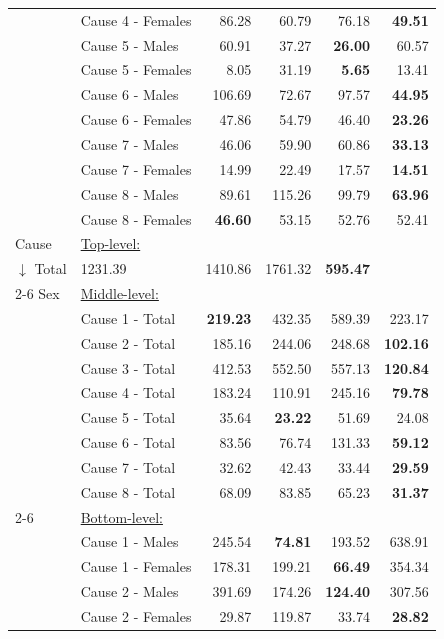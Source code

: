 \begin{center}
\begin{small}
\begin{longtable}{@{}llrrrr@{}}
& Cause 4 - Females & 86.28 & 60.79 & 76.18 & \textbf{49.51} \\
& Cause 5 - Males & 60.91 & 37.27 & \textbf{26.00} & 60.57 \\
& Cause 5 - Females & 8.05 & 31.19 & \textbf{5.65} & 13.41 \\
& Cause 6 - Males & 106.69 & 72.67 & 97.57 & \textbf{44.95} \\
& Cause 6 - Females & 47.86 & 54.79 & 46.40 & \textbf{23.26} \\
& Cause 7 - Males & 46.06 & 59.90 & 60.86 & \textbf{33.13} \\
& Cause 7 - Females & 14.99 & 22.49 & 17.57 & \textbf{14.51} \\
& Cause 8 - Males & 89.61 & 115.26 & 99.79 & \textbf{63.96} \\
& Cause 8 - Females & \textbf{46.60} & 53.15 & 52.76 & 52.41 \\
\midrule
Cause & \multicolumn{5}{l}{\underline{Top-level:}}\\
$\downarrow$  Total & 1231.39 & 1410.86 & 1761.32 & \textbf{595.47} \\
\cmidrule{2-6}
Sex & \multicolumn{5}{l}{\underline{Middle-level:}}\\
& Cause 1 - Total & \textbf{219.23} & 432.35 & 589.39 & 223.17 \\
& Cause 2 - Total & 185.16 & 244.06 & 248.68 & \textbf{102.16} \\
& Cause 3 - Total & 412.53 & 552.50 & 557.13 & \textbf{120.84} \\
& Cause 4 - Total & 183.24 & 110.91 & 245.16 & \textbf{79.78} \\
& Cause 5 - Total & 35.64 & \textbf{23.22} & 51.69 & 24.08 \\
& Cause 6 - Total & 83.56 & 76.74 & 131.33 & \textbf{59.12} \\
& Cause 7 - Total & 32.62 & 42.43 & 33.44 & \textbf{29.59} \\
& Cause 8 - Total & 68.09 & 83.85 & 65.23 & \textbf{31.37} \\
\cmidrule{2-6}
& \multicolumn{5}{l}{\underline{Bottom-level:}}\\
& Cause 1 - Males & 245.54 & \textbf{74.81} & 193.52 & 638.91 \\
& Cause 1 - Females & 178.31 & 199.21 & \textbf{66.49} & 354.34 \\
& Cause 2 - Males & 391.69 & 174.26 & \textbf{124.40} & 307.56 \\
& Cause 2 - Females & 29.87 & 119.87 & 33.74 & \textbf{28.82} \\

\end{longtable}
\end{small}
\end{center}
